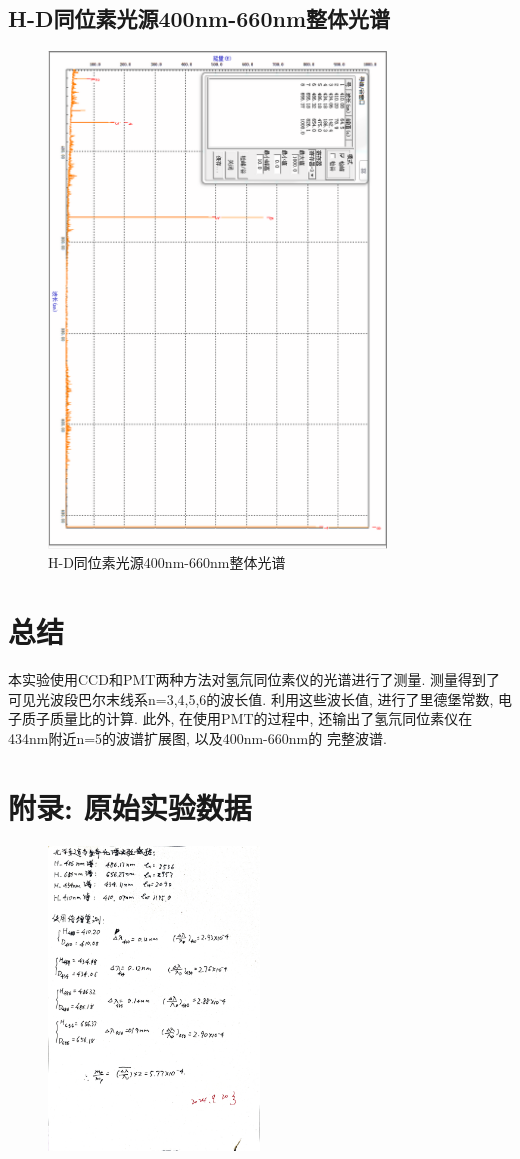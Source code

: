 \documentclass[12pt,a4paper]{article}
\begin{document}
\subsection{H-D同位素光源400nm-660nm整体光谱}
\begin{figure}[H]
    \centering
    \includegraphics[width=0.8\textwidth]{HD_407-667.png}
    \caption{H-D同位素光源400nm-660nm整体光谱}
\end{figure}


\section{总结}
本实验使用CCD和PMT两种方法对氢氘同位素仪的光谱进行了测量. 测量得到了可见光波段巴尔末线系n=3,4,5,6的波长值. 
利用这些波长值, 进行了里德堡常数, 电子质子质量比的计算. 此外, 在使用PMT的过程中, 还输出了氢氘同位素仪在434nm附近n=5的波谱扩展图, 以及400nm-660nm的
完整波谱. 
\section{附录: 原始实验数据}
\begin{figure}[H]
    \centering
    \includegraphics[width=0.5\textwidth]{Appendix.jpg}
\end{figure}
\end{document}
